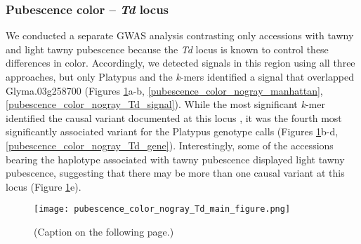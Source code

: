 \subsubsection*{Pubescence color -- \textit{Td} locus}
\label{sv-gwas-main-results-pubescence-color-td}

We conducted a separate GWAS analysis contrasting only accessions with tawny and light
tawny pubescence because the \textit{Td} locus is known to control
these differences in color. Accordingly, we
detected signals in this region using all three approaches, but only Platypus
and the \textit{k}-mers identified a signal that overlapped Glyma.03g258700
(Figures \ref{pubescence-color-main-figure}a-b,
\ref{pubescence_color_nogray_manhattan}, \ref{pubescence_color_nogray_Td_signal}).
While the most significant \textit{k}-mer identified the causal variant documented
at this locus \citep{yan2020}, it was the fourth most significantly associated variant
for the Platypus genotype calls (Figures
\ref{pubescence-color-main-figure}b-d, \ref{pubescence_color_nogray_Td_gene}).
Interestingly, some of the accessions bearing the haplotype associated with tawny pubescence
displayed light tawny pubescence, suggesting that there may be more than one causal
variant at this locus (Figure \ref{pubescence-color-main-figure}e).

\begin{figure}
	\centering
	\texttt{[image: pubescence\_color\_nogray\_Td\_main\_figure.png]}
	\caption[Results of SNP/indel- and \textit{k}-mer-based GWAS at the
	\textit{Td} locus for pubescence color]{(Caption on the following page.)}
	\label{pubescence-color-main-figure}
\end{figure}

